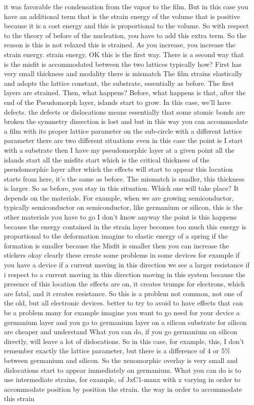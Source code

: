 it was favorable the condensation from the vapor to the film. But in this case you have an additional term that is the strain energy of the volume that is positive because it is a cost energy and this is proportional to the volume. So with respect to the theory of before of the nucleation, you have to add this extra term. So the reason is this is not relaxed this is strained. As you increase, you increase the strain energy. strain energy. OK this is the first way.
There is a second way that is the misfit is accommodated between the two lattices typically how? First has very small thickness and modality there is mismatch The film strains elastically and adopts the lattice constant, the substrate, essentially as before. The first layers are strained. Then, what happens? Before, what happens is that, after the end of the Pseudomorph layer, islands start to grow. In this case, we'll have defects. the defects or dislocations means essentially that some atomic bonds are broken the symmetry dissection is lost and but in this way you can accommodate a film with its proper lattice parameter on the sub-circle with a different lattice parameter there are two different situations even in this case the point is I start with a substrate then I have my pseudomorphic layer at a given point all the islands start all the misfits start which is the critical thickness of the pseudomorphic layer after which the effects will start to appear this location starts from here, it's the same as before. The mismatch is smaller, this thickness is larger. So as before, you stay in this situation. Which one will take place? It depends on the materials. For example, when we are growing semiconductor, typically semiconductor on semiconductor, like germanium or silicon, this is the other materials you have to go I don't know anyway the point is this happens because the energy contained in the strain layer becomes too much this energy is proportional to the deformation imagine to elastic energy of a spring if the formation is smaller because the Misfit is smaller then you can increase the stickers okay clearly these create some problems in some devices for example if you have a device if a current moving in this direction we see a larger resistance if i respect to a current moving in this direction moving in this system because the presence of this location the effects are on, it creates trumps for electrons, which are fatal, and it creates resistance. So this is a problem not common, not one of the old, but all electronic devices. better to try to avoid to have effects that can be a problem many for example imagine you want to go need for your device a germanium layer and you go to germanium layer on a silicon substrate for silicon are cheaper and understand What you can do, if you go germanium on silicon directly, will leave a lot of dislocations. So in this case, for example, this, I don't remember exactly the lattice parameter, but there is a difference of 4 or 5\% between germanium and silicon. So the xenomorphic overlay is very small and dislocations start to appear immediately on germanium. What you can do is to use intermediate strains, for example, of JxC1-manx with x varying in order to accommodate position by position the strain. the way in order to accommodate this strain 